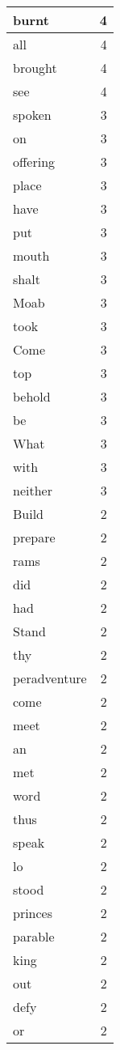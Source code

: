 \begin{center}
\begin{longtable}{l|r}
burnt & 4\\ \hline 
all & 4\\ \hline 
brought & 4\\ \hline 
see & 4\\ \hline 
spoken & 3\\ \hline 
on & 3\\ \hline 
offering & 3\\ \hline 
place & 3\\ \hline 
have & 3\\ \hline 
put & 3\\ \hline 
mouth & 3\\ \hline 
shalt & 3\\ \hline 
Moab & 3\\ \hline 
took & 3\\ \hline 
Come & 3\\ \hline 
top & 3\\ \hline 
behold & 3\\ \hline 
be & 3\\ \hline 
What & 3\\ \hline 
with & 3\\ \hline 
neither & 3\\ \hline 
Build & 2\\ \hline 
prepare & 2\\ \hline 
rams & 2\\ \hline 
did & 2\\ \hline 
had & 2\\ \hline 
Stand & 2\\ \hline 
thy & 2\\ \hline 
peradventure & 2\\ \hline 
come & 2\\ \hline 
meet & 2\\ \hline 
an & 2\\ \hline 
met & 2\\ \hline 
word & 2\\ \hline 
thus & 2\\ \hline 
speak & 2\\ \hline 
lo & 2\\ \hline 
stood & 2\\ \hline 
princes & 2\\ \hline 
parable & 2\\ \hline 
king & 2\\ \hline 
out & 2\\ \hline 
defy & 2\\ \hline 
or & 2\\ \hline 

\end{longtable}
\end{center}
